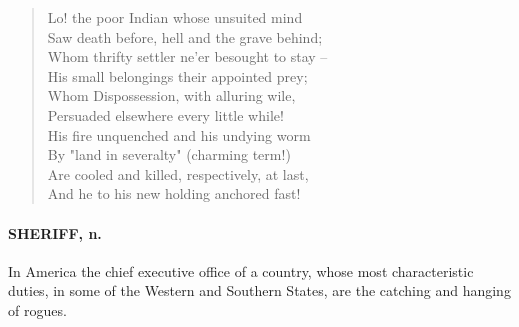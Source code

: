 \documentclass[11pt]{article}
\begin{document}
\begin{quote}   Lo! the poor Indian whose unsuited mind \\
  Saw death before, hell and the grave behind; \\
  Whom thrifty settler ne'er besought to stay -- \\
  His small belongings their appointed prey; \\
  Whom Dispossession, with alluring wile, \\
  Persuaded elsewhere every little while! \\
  His fire unquenched and his undying worm \\
  By "land in severalty" (charming term!) \\
  Are cooled and killed, respectively, at last, \\
  And he to his new holding anchored fast!  \end{quote}

\paragraph{SHERIFF, n.}  In America the chief executive office of a country, whose
most characteristic duties, in some of the Western and Southern
States, are the catching and hanging of rogues.
\end{document}
